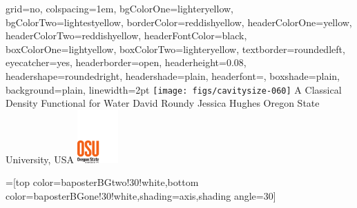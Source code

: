\documentclass[landscape,a0paper,final,showframe]{baposter}
\begin{document}

\begin{poster}{
  grid=no,
  colspacing=1em,
  bgColorOne=lighteryellow,
  bgColorTwo=lightestyellow,
  borderColor=reddishyellow,
  headerColorOne=yellow,
  headerColorTwo=reddishyellow,
  headerFontColor=black,
  boxColorOne=lightyellow,
  boxColorTwo=lighteryellow,
  textborder=roundedleft,
  eyecatcher=yes,
  headerborder=open,
  headerheight=0.08\textheight,
  headershape=roundedright,
  headershade=plain,
  headerfont=\Large\textsf, %
  boxshade=plain,
  background=plain,
  linewidth=2pt
  }
  { %
    \texttt{[image: figs/cavitysize-060]}
  }
  {\sf %
  A Classical Density Functional for Water}
  {\sf %
  David Roundy\hspace{3em}
  Jessica Hughes\hspace{3em}
  Oregon State University, USA
  }
  {
    \includegraphics[height=5.5em]{figs/osu-logo}
  }

  =[top color=baposterBGtwo!30!white,bottom color=baposterBGone!30!white,shading=axis,shading angle=30]

     \newlength{\leftimgwidth}
     \setlength{\leftimgwidth}{0.78em+8.0em}


\end{poster}
\end{document}
